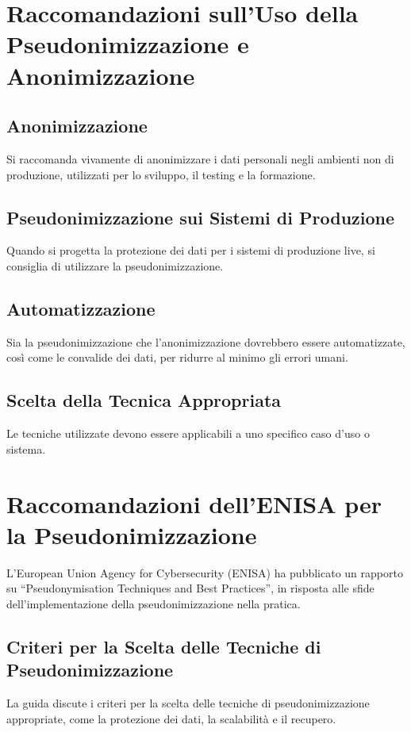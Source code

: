 \section{Raccomandazioni sull'Uso della Pseudonimizzazione e Anonimizzazione}
\subsection{Anonimizzazione}
Si raccomanda vivamente di anonimizzare i dati personali negli ambienti non di produzione, utilizzati per lo sviluppo, il testing e la formazione. 

\subsection{Pseudonimizzazione sui Sistemi di Produzione}
Quando si progetta la protezione dei dati per i sistemi di produzione live, si consiglia di utilizzare la pseudonimizzazione. 

\subsection{Automatizzazione}
Sia la pseudonimizzazione che l'anonimizzazione dovrebbero essere automatizzate, così come le convalide dei dati, per ridurre al minimo gli errori umani.

\subsection{Scelta della Tecnica Appropriata}
Le tecniche utilizzate devono essere applicabili a uno specifico caso d'uso o sistema.


\section{Raccomandazioni dell'ENISA per la Pseudonimizzazione}
L'European Union Agency for Cybersecurity (ENISA) ha pubblicato un rapporto su “Pseudonymisation Techniques and Best Practices”, in risposta alle sfide dell'implementazione della pseudonimizzazione nella pratica.

\subsection{Criteri per la Scelta delle Tecniche di Pseudonimizzazione}
La guida discute i criteri per la scelta delle tecniche di pseudonimizzazione appropriate, come la protezione dei dati, la scalabilità e il recupero. 

